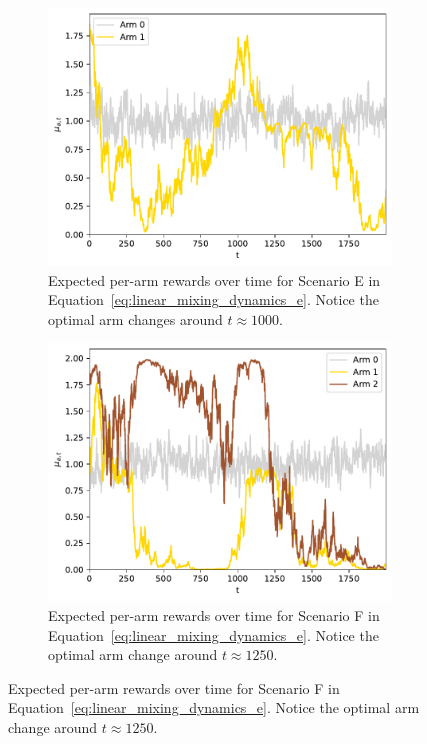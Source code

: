 \begin{figure}[!ht]
	\centering
	\begin{subfigure}[b]{0.47\textwidth}
		\includegraphics[width=\textwidth]{./fods_figs/dynamic/softmax/dynamics_e}
		\caption{Expected per-arm rewards over time for Scenario E in Equation~\eqref{eq:linear_mixing_dynamics_e}.
			Notice the optimal arm changes around $t\approx1000$.}
		\label{fig:linear_mixing_dynamics_e_softmax}%
	\end{subfigure}\qquad
	\begin{subfigure}[b]{0.47\textwidth}
		\includegraphics[width=\textwidth]{./fods_figs/dynamic/softmax/dynamics_f}
		\caption{Expected per-arm rewards over time for Scenario F in Equation~\eqref{eq:linear_mixing_dynamics_e}.
			Notice the optimal arm change around $t\approx1250$.}
		\label{fig:linear_mixing_dynamics_f_softmax}
	\end{subfigure} %
	

\end{figure}
